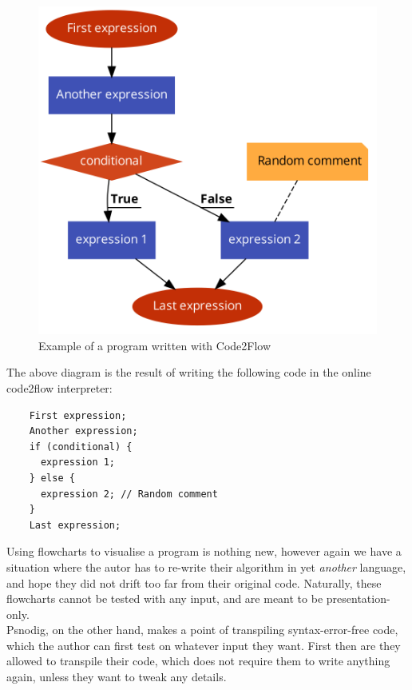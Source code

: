 \begin{figure}[ht]
    \centering
    \includegraphics[scale=0.2]{assets/code2flow_example.png}
    \caption{Example of a program written with Code2Flow}
    \label{fig:enter-label}
\end{figure}

The above diagram is the result of writing the following code in the online code2flow interpreter:

\begin{lstlisting}
    First expression;
    Another expression;
    if (conditional) {
      expression 1;
    } else {
      expression 2; // Random comment
    }
    Last expression;
\end{lstlisting}

Using flowcharts to visualise a program is nothing new, however again we have a situation where the autor has to re-write their algorithm in yet \textit{another} language, and hope they did not drift too far from their original code. Naturally, these flowcharts cannot be tested with any input, and are meant to be presentation-only. \hfill \\

Psnodig, on the other hand, makes a point of transpiling syntax-error-free code, which the author can first test on whatever input they want. First then are they allowed to transpile their code, which does not require them to write anything again, unless they want to tweak any details.